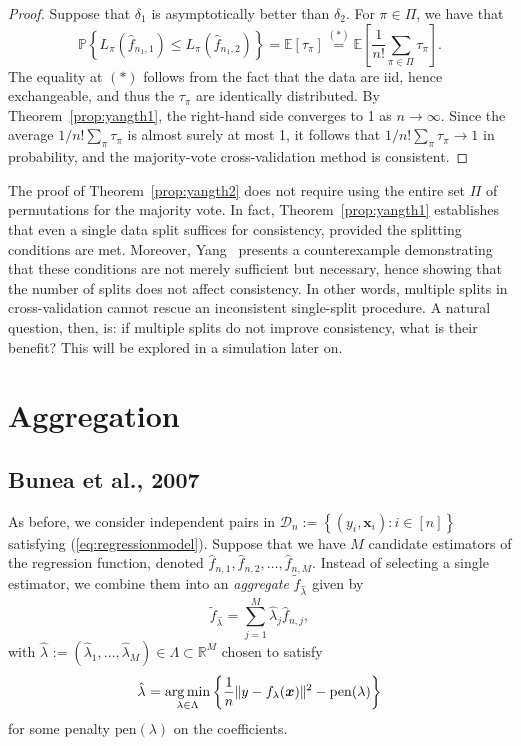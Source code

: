 \documentclass[12pt, letter paper]{article}
\newcommand{\1}{\mathmybb{1}}
\DeclareMathOperator*{\argmin}{arg\,min}
\newcommand{\R}{\mathbb{R}}
\newcommand{\0}{\emptyset}
\newcommand{\prob}{\mathbb{P}}
\newcommand{\Ep}[1]{\mathbb{E}\left[ #1 \right]}
\newcommand{\paren}[1]{\left(#1 \right)}
\newcommand{\set}[1]{\left\{ #1 \right\}}
\newcommand{\norm}[1]{|\hspace{-1pt}|#1 |\hspace{-1pt}|}
\newcommand{\normsq}[1]{\norm{#1}^{2}}
\newcommand{\data}{\mathcal{D}_{n}}
\newcommand{\x}{\boldsymbol{x}}
\newcommand{\fhat}[2]{\hat{f}_{#1, #2}}
\newcommand{\ftilde}[1]{\tilde{f}_{#1}}
\newcommand{\lambdahat}[1]{\hat{\lambda}_{#1}}
\begin{document}
\begin{proof}
    Suppose that \(\delta_{1}\) is asymptotically better than \(\delta_{2}\). For \(\pi\in \Pi\), we have that
    \[\prob\set{L_{\pi}\paren{\fhat{n_{1}}{1}} \leq L_{\pi}\paren{\fhat{n_{1}}{2}}} = \Ep{\tau_{\pi}} \stackrel{(*)}{=} \Ep{\frac{1}{n!}\sum_{\pi\in\Pi}\tau_{\pi}}.\]
    The equality at \((*)\) follows from the fact that the data are iid, hence exchangeable, and thus the \(\tau_\pi\) are identically distributed. By Theorem~\ref{prop:yangth1}, the right-hand side converges to 1 as \(n\to\infty\). Since the average \(1/n! \sum_{\pi}\tau_{\pi}\) is almost surely at most 1, it follows that \(1/n! \sum_{\pi}\tau_{\pi} \to 1\) in probability, and the majority-vote cross-validation method is consistent.
\end{proof}

The proof of Theorem~\ref{prop:yangth2} does not require using the entire set \(\Pi\) of permutations for the majority vote. In fact, Theorem~\ref{prop:yangth1} establishes that even a single data split suffices for consistency, provided the splitting conditions are met. Moreover, Yang~\cite{yang_2007} presents a counterexample demonstrating that these conditions are not merely sufficient but necessary, hence showing that the number of splits does not affect consistency. In other words, multiple splits in cross-validation cannot rescue an inconsistent single-split procedure. A natural question, then, is: if multiple splits do not improve consistency, what is their benefit? This will be explored in a simulation later on.



\section{Aggregation}
\subsection{Bunea et al., 2007}

As before, we consider independent pairs in \(\data := \set{\paren{y_{i}, \x_{i}}:i\in [n]}\) satisfying (\ref{eq:regressionmodel}). Suppose that we have \(M\) candidate estimators of the regression function, denoted \(\fhat{n}{1}, \fhat{n}{2}, \ldots, \fhat{n}{M}\). Instead of selecting a single estimator, we combine them into an \emph{aggregate} \(\ftilde{\lambdahat{}}\) given by
\[\ftilde{\lambdahat{}} = \sum_{j=1}^{M}\lambdahat{j} \fhat{n}{j},\]
with \(\lambdahat{}:=\paren{\lambdahat{1}, \ldots, \lambdahat{M}}\in \Lambda\subset\R^{M}\) chosen to satisfy
\begin{equation}\label{eq:weights}
    \lambdahat{} = \argmin_{\lambda\in\Lambda}\set{\frac{1}{n}\normsq{y - f_{\lambda}(\x)} - \mathrm{pen}(\lambda)}
\end{equation}
for some penalty \(\mathrm{pen}(\lambda)\) on the coefficients.
\end{document}
